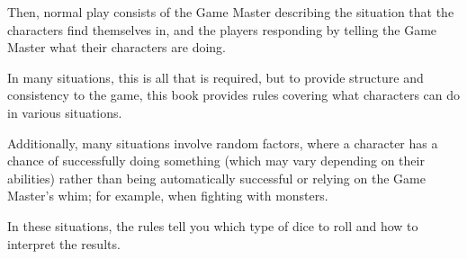 \begin{multicols*}{2}
Then, normal play consists of the Game Master describing the situation that the characters find themselves in, and the players responding by telling the Game Master what their characters are doing.

In many situations, this is all that is required, but to provide structure and consistency to the game, this book provides rules covering what characters can do in various situations.

Additionally, many situations involve random factors, where a character has a chance of successfully doing something (which may vary depending on their abilities) rather than being automatically successful or relying on the Game Master’s whim; for example, when fighting with monsters.

In these situations, the rules tell you which type of dice to roll and how to interpret the results.

\end{multicols*}

